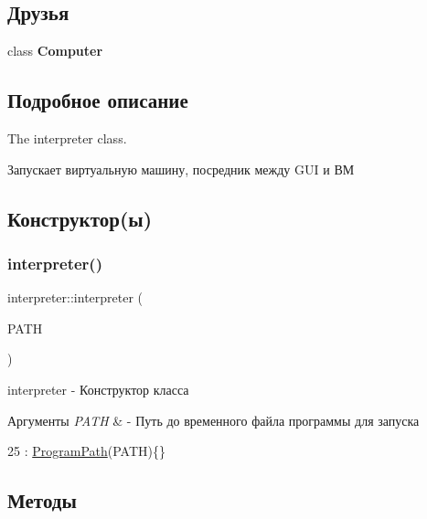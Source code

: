 \subsection*{Друзья}
\begin{DoxyCompactItemize}
\item 
\hypertarget{classinterpreter_ab9eca035c1f2a85f44c28a92b53d320c}{}\label{classinterpreter_ab9eca035c1f2a85f44c28a92b53d320c} 
class {\bfseries Computer}
\end{DoxyCompactItemize}


\subsection{Подробное описание}
The interpreter class. 

Запускает виртуальную машину, посредник между G\+UI и ВМ 

\subsection{Конструктор(ы)}
\hypertarget{classinterpreter_ae7359f1d2aa18579a2797f49835c8671}{}\label{classinterpreter_ae7359f1d2aa18579a2797f49835c8671} 
\subsubsection{\texorpdfstring{interpreter()}{interpreter()}}
{\footnotesize\ttfamily interpreter\+::interpreter (\begin{DoxyParamCaption}\item[{Q\+String}]{P\+A\+TH }\end{DoxyParamCaption})\hspace{0.3cm}{\ttfamily [inline]}}



interpreter -\/ Конструктор класса 


\begin{DoxyParams}{Аргументы}
{\em P\+A\+TH} & -\/ Путь до временного файла программы для запуска \\
\hline
\end{DoxyParams}

\begin{DoxyCode}
25 : \hyperlink{classinterpreter_acafdc7a0e329a4ed0f79930ed33f52be}{ProgramPath}(PATH)\{\}
\end{DoxyCode}


\subsection{Методы}
\hypertarget{classinterpreter_a5153712027e3e4344f72336f8b5cfa6d}{}\label{classinterpreter_a5153712027e3e4344f72336f8b5cfa6d} 

